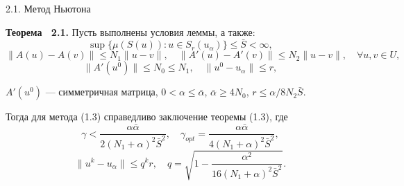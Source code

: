 \documentclass[10pt,pdf, mathserif, hyperref={unicode}]{beamer}
\begin{document}
%		
\begin{frame}{2.1. Метод Ньютона}
	\begin{block}{\bf Теорема ~2.1.}
		Пусть выполнены условия леммы, а также: \quad $$\sup\{\mu(S(u)): u\in S_r(u_\alpha)\}\le\bar S <\infty,$$ 
		$$\|A(u)-A(v)\|\le N_1\|u-v\|,\quad
		\|A'(u)-A'(v)\|\le N_2\|u-v\|, \quad \forall u, v \in U,$$
		$$\|A'(u^0)\| \le N_0\le N_1, \quad \|u^0-u_\alpha\| \le r,$$
		
		\smallskip
		$A'(u^0)$ --- симметричная матрица, $0<\alpha\le\bar\alpha$, $\bar\alpha\ge 4N_0$, $r\le\alpha/8N_2\bar S$.
		
		\smallskip
		Тогда для метода (1.3) справедливо заключение теоремы (1.3), где
		$$\gamma<\frac{\alpha\bar\alpha}{2(N_1+\alpha)^2\bar S^2},
		\quad
		{\gamma}_{opt}=\frac{\alpha\bar\alpha}{4(N_1+\alpha)^2\bar S^2},$$ 
		$$\|u^k-u_\alpha\|\le q^k r, \quad q=\sqrt{1-\frac{\alpha ^2}{16(N_1+\alpha)^2\bar S^2}}.$$
	\end{block}
\end{frame}
\end{document}

